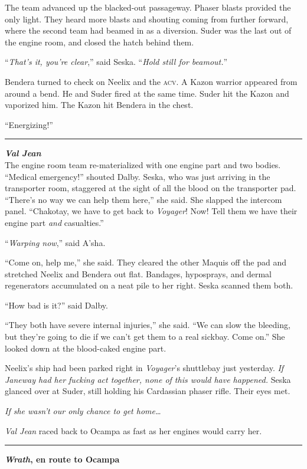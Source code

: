 \documentclass[twoside,letterpaper,12pt]{memoir}
\begin{document}
The team advanced up the blacked-out passageway. Phaser blasts provided the only light. They heard more blasts and shouting coming from further forward, where the second team had beamed in as a diversion. Suder was the last out of the engine room, and closed the hatch behind them.

``\textit{That's it, you're clear},'' said Seska. ``\textit{Hold still for beamout.}''

Bendera turned to check on Neelix and the \textsc{acv}. A Kazon warrior appeared from around a bend. He and Suder fired at the same time. Suder hit the Kazon and vaporized him. The Kazon hit Bendera in the chest.

``Energizing!''

\fancybreak{\rule{3cm}{0.4 pt}}
\noindent\textit{\textbf{Val Jean}}\\

The engine room team re-materialized with one engine part and two bodies. ``Medical emergency!'' shouted Dalby. Seska, who was just arriving in the transporter room, staggered at the sight of all the blood on the transporter pad. ``There's no way we can help them here,'' she said. She slapped the intercom panel. ``Chakotay, we have to get back to \textit{Voyager}! Now! Tell them we have their engine part \textit{and} casualties.''

``\textit{Warping now},'' said A'sha.

``Come on, help me,'' she said. They cleared the other Maquis off the pad and stretched Neelix and Bendera out flat. Bandages, hyposprays, and dermal regenerators accumulated on a neat pile to her right. Seska scanned them both.

``How bad is it?'' said Dalby.

``They both have severe internal injuries,'' she said. ``We can slow the bleeding, but they're going to die if we can't get them to a real sickbay. Come on.'' She looked down at the blood-caked engine part.

Neelix's ship had been parked right in \textit{Voyager}'s shuttlebay just yesterday. \textit{If Janeway had her fucking act together, none of this would have happened.} Seska glanced over at Suder, still holding his Cardassian phaser rifle. Their eyes met.

\textit{If she wasn't our only chance to get home\ldots }

\textit{Val Jean} raced back to Ocampa as fast as her engines would carry her.

\fancybreak{\rule{3cm}{0.4 pt}}
\noindent\textbf{\textit{Wrath}, en route to Ocampa}\\
\end{document}
